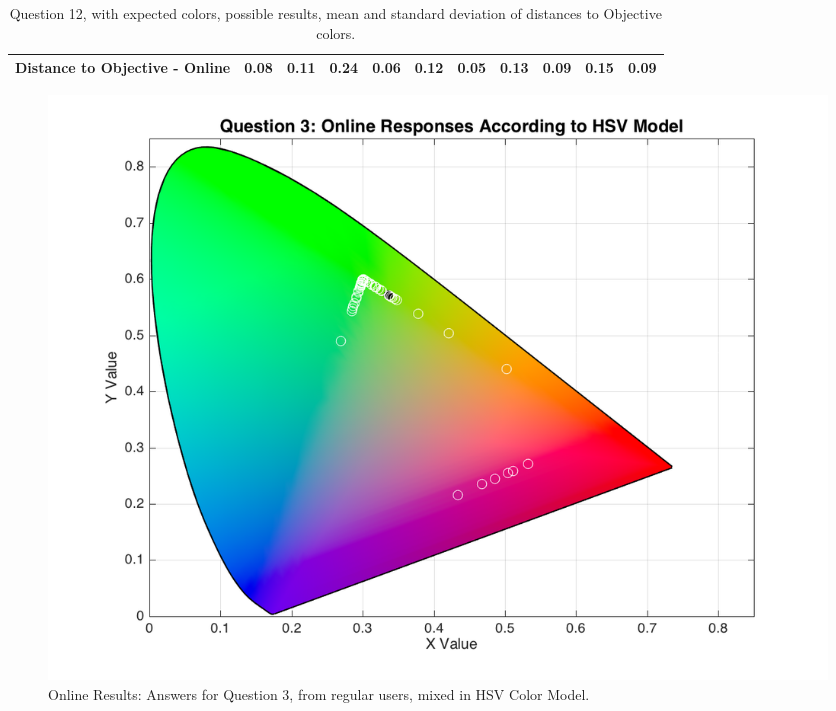 \begin{table}[H]
{\begin{tabular}{lccccccccccccc}
    \multicolumn{4}{l}{Distance to Objective - Online}                                                                                               & \multicolumn{1}{|c}{\textbf{0.08}}        & \multicolumn{1}{c|}{0.11}    & \multicolumn{1}{|c}{0.24}        & \multicolumn{1}{c|}{0.06}    & \multicolumn{1}{|c}{0.12}       & \multicolumn{1}{c|}{0.05}    & \multicolumn{1}{|c}{0.13}        & \multicolumn{1}{c|}{0.09}    & \multicolumn{1}{|c}{0.15}       & \multicolumn{1}{c|}{0.09}    \\ \hline
    \end{tabular}}
  \caption[Question 12, with expected Results.]{Question 12, with expected colors, possible results, mean and standard deviation of distances to Objective colors.}
  \label{table:lab_q12_expected}
\end{table}
%
\begin{figure}[htbp]
  \centering
  \begin{minipage}{0.48\textwidth}
    \centering
    \includegraphics[width=\textwidth]{images/3_online_HSVresponses.png}
    \caption[Online Results: Answers for Question 3, from regular users, mixed in HSV Color Model.]{Online Results: Answers for Question 3, from regular users, mixed in HSV Color Model.}
    \label{fig:onlinehsvregular_3}
  \end{minipage}\hfill
  \begin{minipage}{0.48\textwidth}
    \centering

\end{minipage}
\end{figure}
